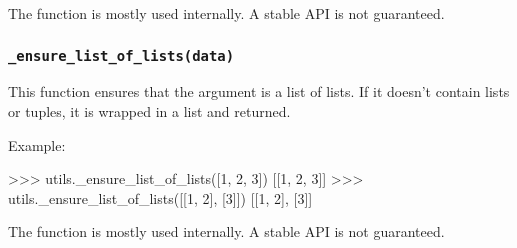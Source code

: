 \noindent The function is mostly used internally. A stable API is not guaranteed.


\subsubsection{\texttt{\_ensure\_list\_of\_lists(data)}}

This function ensures that the argument is a list of lists. If it doesn't
contain lists or tuples, it is wrapped in a list and returned.

\vspace{.5\baselineskip}

\noindent Example:

\vspace{.5\baselineskip}
\begin{pythoncode}
>>> utils._ensure_list_of_lists([1, 2, 3])
[[1, 2, 3]]
>>> utils._ensure_list_of_lists([[1, 2], [3]])
[[1, 2], [3]]
\end{pythoncode}

\noindent The function is mostly used internally. A stable API is not guaranteed.
